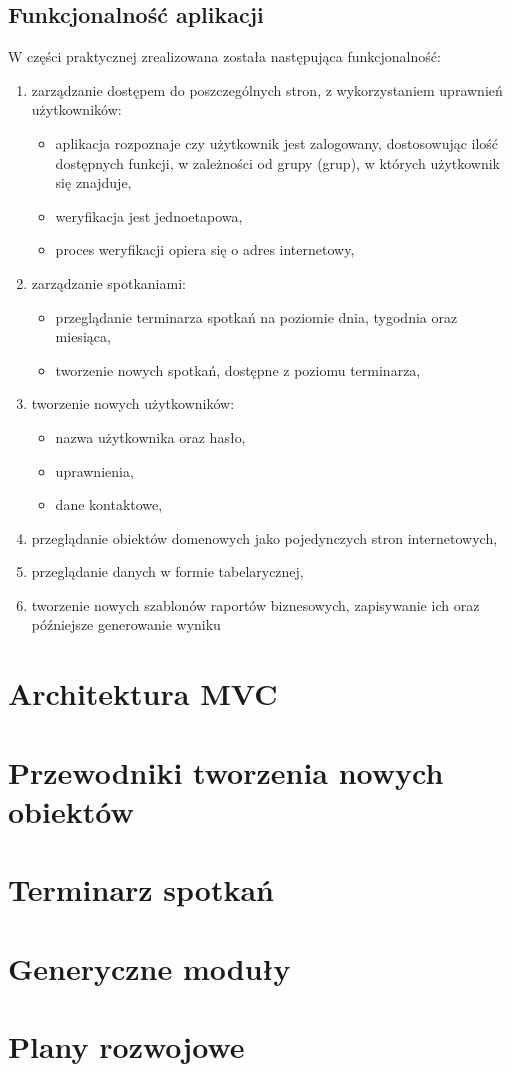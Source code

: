 	\subsection{Funkcjonalność aplikacji}
	W części praktycznej zrealizowana została następująca funkcjonalność:
	\begin{enumerate}
		\item zarządzanie dostępem do poszczególnych stron, z wykorzystaniem uprawnień użytkowników:
		\begin{itemize}
			\item aplikacja rozpoznaje czy użytkownik jest zalogowany, dostosowując ilość dostępnych funkcji, w zależności od grupy (grup), w których użytkownik się znajduje,
			\item weryfikacja jest jednoetapowa,
			\item proces weryfikacji opiera się o adres internetowy,
		\end{itemize}
		\item zarządzanie spotkaniami:
		\begin{itemize}
			\item przeglądanie terminarza spotkań na poziomie dnia, tygodnia oraz miesiąca,
			\item tworzenie nowych spotkań, dostępne z poziomu terminarza,
		\end{itemize}
		\item tworzenie nowych użytkowników:
		\begin{itemize}
			\item nazwa użytkownika oraz hasło,
			\item uprawnienia,
			\item dane kontaktowe,
		\end{itemize}
		\item przeglądanie obiektów domenowych jako pojedynczych stron internetowych,
		\item przeglądanie danych w formie tabelarycznej,
		\item tworzenie nowych szablonów raportów biznesowych, zapisywanie ich oraz późniejsze generowanie wyniku
	\end{enumerate}

\section{Architektura MVC} 								
\section{Przewodniki tworzenia nowych obiektów} 		
\section{Terminarz spotkań}								
\section{Generyczne moduły} 							
\section{Plany rozwojowe}								